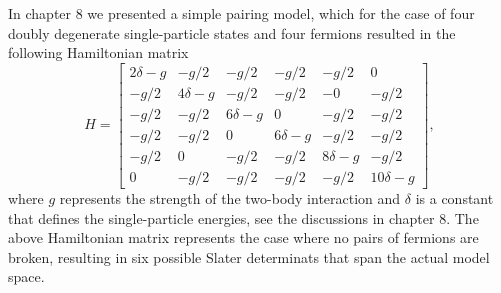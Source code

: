 In chapter 8 we presented a simple pairing model, which for the case of four doubly degenerate single-particle states and 
four fermions resulted in the following Hamiltonian matrix
 \[
  H = \begin{bmatrix}
  2\delta -g & -g/2 & -g/2 & -g/2 & -g/2 & 0 \\ -g/2 & 4\delta -g &
  -g/2 & -g/2 & -0 & -g/2 \\ -g/2 & -g/2 & 6\delta -g & 0 & -g/2 &
  -g/2 \\ -g/2 & -g/2 & 0 & 6\delta-g & -g/2 & -g/2 \\ -g/2 & 0 & -g/2
  & -g/2 & 8\delta-g & -g/2 \\ 0 & -g/2 & -g/2 & -g/2 & -g/2 &
  10\delta -g
  \end{bmatrix},
  \]
where $g$ represents the strength of the two-body interaction and $\delta$ is a constant that defines the single-particle energies, see the discussions in chapter 8.  The above Hamiltonian matrix represents the case where no pairs of fermions are broken, resulting in six possible Slater determinats that span the actual model space.

